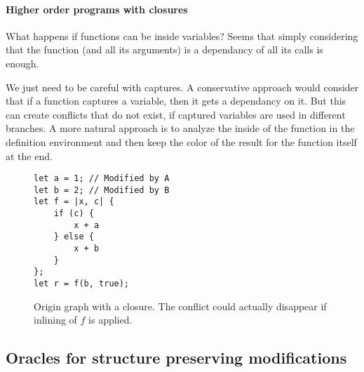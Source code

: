 \documentclass[a4paper,10pt]{article}
\begin{document}
\paragraph{Higher order programs with closures} What happens if functions can be inside variables? Seems that simply considering that the function (and all its arguments) is a dependancy of all its calls is enough.

We just need to be careful with captures. A conservative approach would consider that if a function captures a variable, then it gets a dependancy on it. But this can create conflicts that do not exist, if captured variables are used in different branches. A more natural approach is to analyze the inside of the function in the definition environment and then keep the color of the result for the function itself at the end.

\begin{figure}[!ht]
\begin{minipage}{.5\textwidth}
\begin{lstlisting}
let a = 1; // Modified by A
let b = 2; // Modified by B
let f = |x, c| {
    if (c) {
        x + a
    } else {
        x + b
    }
};
let r = f(b, true);
\end{lstlisting}
\end{minipage}\hfill
\begin{minipage}{.45\textwidth}
\centering{}
\end{minipage}
\caption{Origin graph with a closure. The conflict could actually disappear if inlining of $f$ is applied.}
\label{fig:closure}
\end{figure}

\subsection{Oracles for structure preserving modifications}
\end{document}
